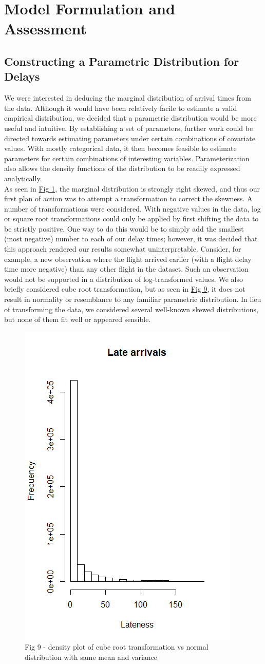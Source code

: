 \documentclass[12pt, a4paper, openany]{book}
\newcommand\tab[1][1cm]{\hspace*{#1}}
\begin{document}
\chapter{Model Formulation and Assessment}
	\section{Constructing a Parametric Distribution for \\Delays}
	 \tab We were interested in deducing the marginal distribution of arrival times from the data. Although it would have been relatively facile to estimate a valid empirical distribution, we decided that a parametric distribution would be more useful and intuitive. By establishing a set of parameters, further work could be directed towards estimating parameters under certain combinations of covariate values. With mostly categorical data, it then becomes feasible to estimate parameters for certain combinations of interesting variables. Parameterization also allows the density functions of the distribution to be readily expressed analytically.\\
	\tab As seen in \underline{Fig 1}, the marginal distribution is strongly right skewed, and thus our first plan of action was to attempt a transformation to correct the skewness. A number of transformations were considered. With negative values in the data, log or square root transformations could only be applied by first shifting the data to be strictly positive. One way to do this would be to simply add the smallest (most negative) number to each of our delay times; however, it was decided that this approach rendered our results somewhat uninterpretable. Consider, for example, a new observation where the flight arrived earlier (with a flight delay time more negative) than any other flight in the dataset. Such an observation would not be supported in a distribution of log-transformed values. We also briefly considered cube root transformation, but as seen in \underline{Fig 9}, it does not result in normality or resemblance to any familiar parametric distribution. In lieu of transforming the data, we considered several well-known skewed distributions, but none of them fit well or appeared sensible.\\
			\begin{figure}
			\centering
	 		\includegraphics[width = .35 \textwidth]{../figures/LateArrivalsHistogram}
	 		\caption{Fig 9 - density plot of cube root transformation vs normal distribution with same mean and variance}
	 		\end{figure}
\end{document}
